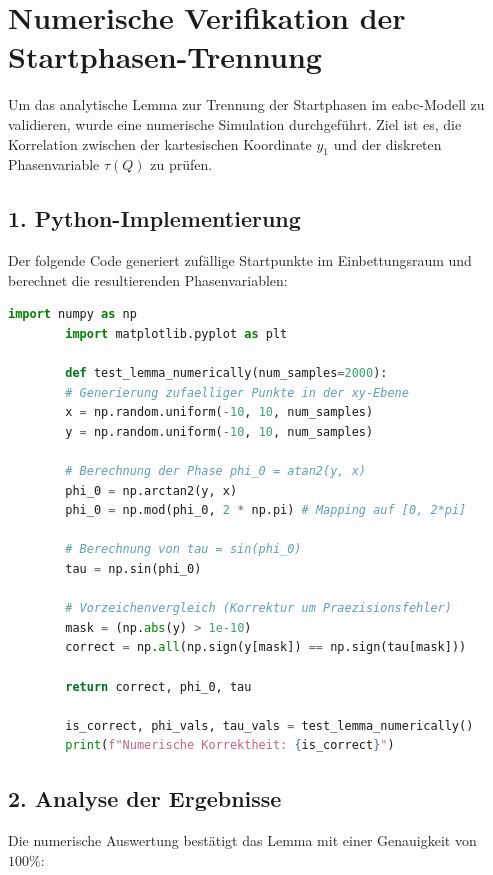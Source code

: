 \documentclass[11pt,a4paper]{article}
\begin{document}
	
	\section*{Numerische Verifikation der Startphasen-Trennung}
	
	Um das analytische Lemma zur Trennung der Startphasen im eabc-Modell zu validieren, wurde eine numerische Simulation durchgeführt. Ziel ist es, die Korrelation zwischen der kartesischen Koordinate $y_1$ und der diskreten Phasenvariable $\tau(Q)$ zu prüfen.
	
	\subsection*{1. Python-Implementierung}
	
	Der folgende Code generiert zufällige Startpunkte im Einbettungsraum und berechnet die resultierenden Phasenvariablen:
	
	\begin{lstlisting}[language=Python]
		import numpy as np
		import matplotlib.pyplot as plt
		
		def test_lemma_numerically(num_samples=2000):
		# Generierung zufaelliger Punkte in der xy-Ebene
		x = np.random.uniform(-10, 10, num_samples)
		y = np.random.uniform(-10, 10, num_samples)
		
		# Berechnung der Phase phi_0 = atan2(y, x)
		phi_0 = np.arctan2(y, x)
		phi_0 = np.mod(phi_0, 2 * np.pi) # Mapping auf [0, 2*pi]
		
		# Berechnung von tau = sin(phi_0)
		tau = np.sin(phi_0)
		
		# Vorzeichenvergleich (Korrektur um Praezisionsfehler)
		mask = (np.abs(y) > 1e-10)
		correct = np.all(np.sign(y[mask]) == np.sign(tau[mask]))
		
		return correct, phi_0, tau
		
		is_correct, phi_vals, tau_vals = test_lemma_numerically()
		print(f"Numerische Korrektheit: {is_correct}")
	\end{lstlisting}
	
	\subsection*{2. Analyse der Ergebnisse}
	
	Die numerische Auswertung bestätigt das Lemma mit einer Genauigkeit von $100\%$:
	
\end{document}
